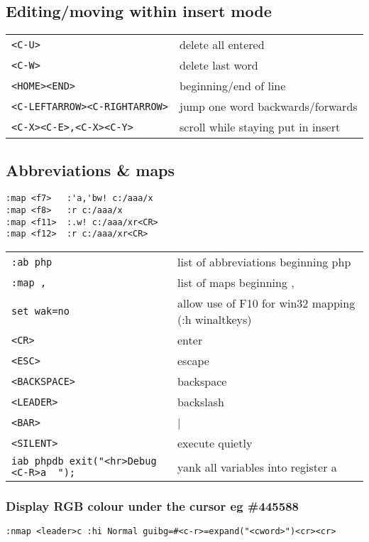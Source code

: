 \subsection{Editing/moving within insert mode}
\begin{center}
\begin{longtable}{l|l}
\verb!<C-U>! & delete all entered\\
\verb!<C-W>! & delete last word\\
\verb!<HOME><END>! & beginning/end of line\\
\verb!<C-LEFTARROW><C-RIGHTARROW>! & jump one word backwards/forwards\\
\verb!<C-X><C-E>,<C-X><C-Y>! & scroll while staying put in insert
\end{longtable}
\end{center}

\subsection{Abbreviations \& maps}
\begin{verbatim}
:map <f7>   :'a,'bw! c:/aaa/x
:map <f8>   :r c:/aaa/x
:map <f11>  :.w! c:/aaa/xr<CR>
:map <f12>  :r c:/aaa/xr<CR>
\end{verbatim}
\begin{center}
\begin{longtable}{l|l}
\verb!:ab php! & list of abbreviations beginning php\\
\verb!:map ,! & list of maps beginning ,\\
\verb!set wak=no! & allow use of F10 for win32 mapping (:h winaltkeys)\\
\verb!<CR>! & enter\\
\verb!<ESC>! & escape\\
\verb!<BACKSPACE>! & backspace\\
\verb!<LEADER>! & backslash\\
\verb!<BAR>! & |\\
\verb!<SILENT>! & execute quietly\\
\verb!iab phpdb exit("<hr>Debug <C-R>a  ");! & yank all variables into register a
\end{longtable}
\end{center}

\subsubsection{Display RGB colour under the cursor eg \#445588}

\begin{verbatim}
:nmap <leader>c :hi Normal guibg=#<c-r>=expand("<cword>")<cr><cr>
\end{verbatim}

